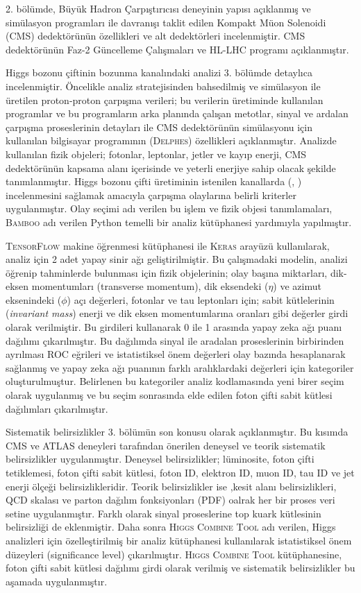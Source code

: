 2. bölümde, Büyük Hadron Çarpıştırıcısı deneyinin yapısı açıklanmış ve simülasyon programları ile davranışı taklit edilen Kompakt Müon Solenoidi (CMS) dedektörünün özellikleri ve alt dedektörleri incelenmiştir. CMS dedektörünün Faz-2 Güncelleme Çalışmaları ve HL-LHC programı açıklanmıştır.

Higgs bozonu çiftinin \wwgg bozunma kanalındaki analizi  3. bölümde detaylıca incelenmiştir. Öncelikle analiz stratejisinden bahsedilmiş ve simülasyon ile üretilen proton-proton çarpışma verileri; bu verilerin üretiminde kullanılan programlar ve bu programların arka planında çalışan metotlar, sinyal ve ardalan çarpışma proseslerinin detayları ile CMS dedektörünün simülasyonu için kullanılan bilgisayar programının (\textsc{Delphes}) özellikleri açıklanmıştır. Analizde kullanılan fizik objeleri; fotonlar, leptonlar, jetler ve kayıp enerji, CMS dedektörünün kapsama alanı içerisinde ve yeterli enerjiye sahip olacak şekilde tanımlanmıştır. Higgs bozonu çifti üretiminin istenilen kanallarda (\wwgg, \ttgg) incelenmesini sağlamak amacıyla çarpışma olaylarına belirli kriterler uygulanmıştır. Olay seçimi adı verilen bu işlem ve fizik objesi tanımlamaları, \textsc{Bamboo} adı verilen Python temelli bir analiz kütüphanesi yardımıyla yapılmıştır.

\textsc{TensorFlow} makine öğrenmesi kütüphanesi ile \textsc{Keras} arayüzü kullanılarak, analiz için 2 adet yapay sinir ağı geliştirilmiştir. Bu çalışmadaki modelin, analizi öğrenip tahminlerde bulunması için fizik objelerinin; olay başına miktarları, dik-eksen momentumları (transverse momentum), dik eksendeki ($\eta$) ve azimut eksenindeki ($\phi$) açı değerleri, fotonlar ve tau leptonları için; sabit kütlelerinin (\emph{invariant mass}) enerji ve dik eksen momentumlarına oranları gibi değerler girdi olarak verilmiştir. Bu girdileri kullanarak 0 ile 1 arasında yapay zeka ağı puanı dağılımı çıkarılmıştır. Bu dağılımda sinyal ile aradalan proseslerinin birbirinden ayrılması ROC eğrileri ve istatistiksel önem değerleri olay bazında hesaplanarak sağlanmış ve yapay zeka ağı puanının farklı aralıklardaki değerleri için kategoriler oluşturulmuştur. Belirlenen bu kategoriler analiz kodlamasında yeni birer seçim olarak uygulanmış ve bu seçim sonrasında elde edilen foton çifti sabit kütlesi dağılımları çıkarılmıştır.

Sistematik belirsizlikler 3. bölümün son konusu olarak açıklanmıştır. Bu kısımda CMS ve ATLAS deneyleri tarafından önerilen deneysel ve teorik sistematik belirsizlikler uygulanmıştır. Deneysel belirsizlikler; lüminosite, foton çifti tetiklemesi, foton çifti sabit kütlesi, foton ID, elektron ID, muon ID, tau ID ve jet enerji ölçeği belirsizlikleridir. Teorik belirsizlikler ise ,kesit alanı belirsizlikleri, QCD skalası ve parton dağılım fonksiyonları (PDF) oalrak her bir proses veri setine uygulanmıştır. Farklı olarak sinyal proseslerine top kuark kütlesinin belirsizliği de eklenmiştir. Daha sonra \textsc{Higgs Combine Tool} adı verilen, Higgs analizleri için özelleştirilmiş bir analiz kütüphanesi kullanılarak istatistiksel önem düzeyleri (significance level) çıkarılmıştır. \textsc{Higgs Combine Tool} kütüphanesine, foton çifti sabit kütlesi dağılımı girdi olarak verilmiş ve sistematik belirsizlikler bu aşamada uygulanmıştır.

